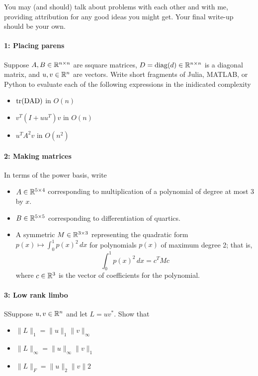 \documentclass[12pt, leqno]{article} %
\begin{document}

You may (and should) talk about problems with each other and with me,
providing attribution for any good ideas you might get.  Your final
write-up should be your own.

\paragraph*{1: Placing parens}
Suppose $A, B \in \mathbb{R}^{n \times n}$ are ssquare matrices, $D =
\operatorname{diag}(d) \in \mathbb{R}^{n \times n}$ is a diagonal matrix,
and $u, v \in \mathbb{R}^n$ are vectors.  Write short fragments of Julia,
MATLAB, or Python to evaluate each of the following expressions in
the inidicated complexity
\begin{itemize}
\item $\operatorname{\operatorname{tr}(DAD)}$ in $O(n)$
\item $v^T (I+uu^T)v$ in $O(n)$
\item $u^T A^2 v$ in $O(n^2)$
\end{itemize}

\paragraph*{2: Making matrices}
In terms of the power basis, write
\begin{itemize}
\item $A \in \mathbb{R}^{5 \times 4}$ corresponding to multiplication of a
  polynomial of degree at most $3$ by $x$.
\item $B \in \mathbb{R}^{5 \times 5}$ corresponding to differentiation of quartics.
\item A symmetric $M \in \mathbb{R}^{3 \times 3}$ representing the quadratic
  form $p(x) \mapsto \int_0^1 p(x)^2 \, dx$ for polynomials $p(x)$ of
  maximum degree 2; that is,
  \[
    \int_0^1 p(x)^2 \, dx = c^T M c
  \]
  where $c \in \mathbb{R}^3$ is the vector of coefficients for the
  polynomial.
\end{itemize}

\paragraph*{3: Low rank limbo}
SSuppose $u, v \in \mathbb{R}^n$ and let $L = uv^*$.  Show that
\begin{itemize}
\item $\|L\|_1 = \|u\|_1 \|v\|_\infty$
\item $\|L\|_\infty = \|u\|_\infty \|v\|_1$
\item $\|L\|_F = \|u\|_2 \|v\|2$
\end{itemize}
\end{document}
